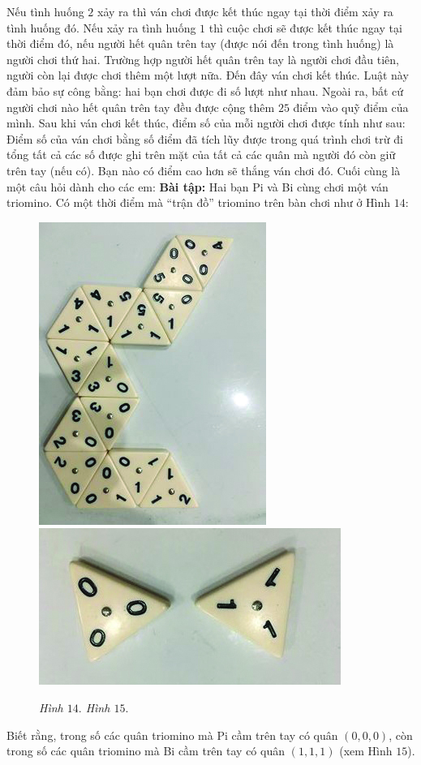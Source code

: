 {{	Nếu tình huống $2$ xảy ra thì ván chơi được kết thúc ngay tại thời điểm xảy ra tình huống đó.
	\vskip 0.1cm
	Nếu xảy ra tình huống $1$ thì cuộc chơi sẽ được kết thúc ngay tại thời điểm đó, nếu người hết quân trên tay (được nói đến trong tình huống) là người chơi thứ hai. Trường hợp người hết quân trên tay là người chơi đầu tiên, người còn lại được chơi thêm một lượt  nữa. Đến đây ván chơi kết thúc. Luật này đảm bảo sự công bằng: hai bạn chơi được đi số lượt như nhau. Ngoài ra, bất cứ người chơi nào hết quân trên tay đều được cộng thêm $25$ điểm vào quỹ điểm của mình.
	\vskip 0.1cm
	Sau khi ván chơi kết thúc, điểm số của mỗi người chơi được tính như sau: Điểm số của ván chơi bằng số điểm đã tích lũy được trong quá trình chơi trừ đi tổng tất cả các số được ghi trên mặt của tất cả các quân mà người đó còn giữ trên tay (nếu có). Bạn nào có điểm cao hơn sẽ thắng ván chơi đó. 
	\vskip 0.1cm
	Cuối cùng là một câu hỏi dành cho các em:
	\vskip 0.3cm
	\textbf{\color{toancuabi}Bài tập:} Hai bạn Pi và Bi cùng chơi một ván triomino. Có một thời điểm mà “trận đồ” triomino trên bàn chơi như ở Hình $14$:
	\vskip 0.1cm
	\begin{figure}[H]
		\centering
		\vspace*{-5pt}
		\captionsetup{labelformat=empty, justification=centering}
		\includegraphics[height=0.3\textwidth,angle=90]{h9}
		\includegraphics[height=0.225\textwidth]{h10}
		\caption{\textit{\small Hình $14.$ \hspace*{75pt} Hình $15.$}}
		\vspace*{-8pt}
	\end{figure}
	Biết rằng, trong số các quân triomino mà Pi cầm trên tay có quân $(0, 0, 0)$, còn trong số các quân triomino mà Bi cầm trên tay có quân $(1, 1, 1)$ (xem Hình $15$).
	\vskip 0.1cm
}}
